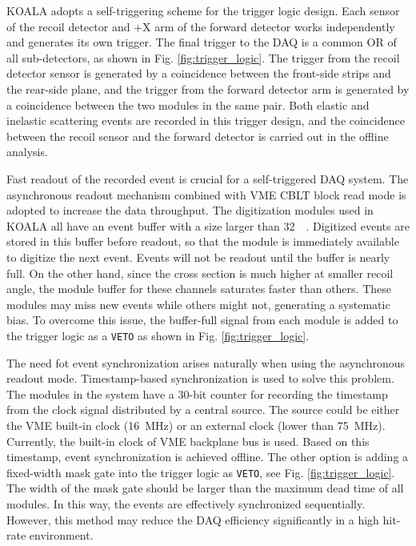 \documentclass[number,5p]{elsarticle}
\begin{document}
KOALA adopts a self-triggering scheme for the trigger logic design.
Each sensor of the recoil detector and +X arm of the forward detector works independently and generates its own trigger. 
The final trigger to the DAQ is a common OR of all sub-detectors, as shown in Fig. \ref{fig:trigger_logic}.
The trigger from the recoil detector sensor is generated by a coincidence between the front-side strips and the rear-side plane, 
and the trigger from the forward detector arm is generated by a coincidence between the two modules in the same pair.
Both elastic and inelastic scattering events are recorded in this trigger
design, and the coincidence between the recoil sensor and the forward detector
is carried out in the offline analysis.

Fast readout of the recorded event is crucial for a self-triggered DAQ system.
The asynchronous readout mechanism combined with VME CBLT block read mode is adopted to increase the data throughput.
The digitization modules used in KOALA all have an event buffer with a size
larger than \SI{32}{\kilo\byte}.
Digitized events are stored in this buffer before readout, so that the module is immediately available to digitize the next event.
Events will not be readout until the buffer is nearly full.
On the other hand, since the cross section is much higher at smaller recoil
angle, the module buffer for these channels saturates faster than others.
These modules may miss new events while others might not, generating a systematic bias.
To overcome this issue, the buffer-full signal from each module is added to the
trigger logic as a \texttt{VETO} as shown in Fig. \ref{fig:trigger_logic}.

The need fot event synchronization arises naturally when using the asynchronous
readout mode.
Timestamp-based synchronization is used to solve this problem.
The modules in the system have a 30-bit counter for recording the timestamp from
the clock signal distributed by a central source.
The source could be either the VME built-in clock (\SI{16}{\MHz}) or an external clock
(lower than \SI{75}{\MHz}).
Currently, the built-in clock of VME backplane bus is used. 
Based on this timestamp, event synchronization is achieved offline.
The other option is adding a fixed-width mask gate into the trigger logic as \texttt{VETO}, see Fig. \ref{fig:trigger_logic}.
The width of the mask gate should be larger than the maximum dead time of all modules.
In this way, the events are effectively synchronized sequentially. 
However, this method may reduce the DAQ efficiency significantly in a high hit-rate environment.
\end{document}
